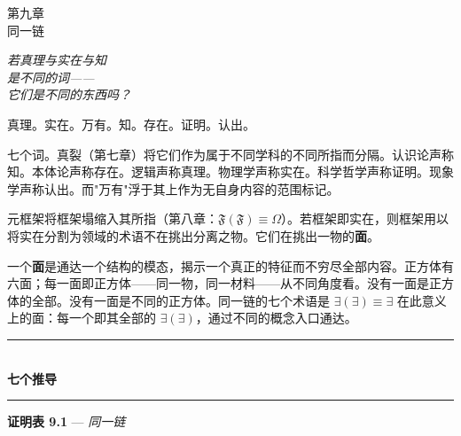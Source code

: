 \documentclass[10pt, openany, oneside]{book}
\renewcommand{\normalsize}{\fontsize{10}{13}\selectfont}
\renewcommand{\large}{\fontsize{11.5}{14}\selectfont}
\renewcommand{\huge}{\fontsize{17}{21}\selectfont}
\begin{document}
\newpage

\begin{center}
    {\huge\scshape 第九章}\\[0.3em]
    {\large\scshape 同一链}
\end{center}

\vspace{1.5em}

\begin{center}
    \itshape
    若真理与实在与知\\
    是不同的词——\\
    它们是不同的东西吗？
\end{center}

\vspace{2em}


\noindent 真理。实在。万有。知。存在。证明。认出。

七个词。真裂（第七章）将它们作为属于不同学科的不同所指而分隔。认识论声称知。本体论声称存在。逻辑声称真理。物理学声称实在。科学哲学声称证明。现象学声称认出。而"万有"浮于其上作为无自身内容的范围标记。

元框架将框架塌缩入其所指（第八章：$\mathfrak{F}(\mathfrak{F}) \equiv \Omega$）。若框架即实在，则框架用以将实在分割为领域的术语不在挑出分离之物。它们在挑出一物的\textbf{面}。

一个\textbf{面}是通达一个结构的模态，揭示一个真正的特征而不穷尽全部内容。正方体有六面；每一面即正方体——同一物，同一材料——从不同角度看。没有一面是正方体的全部。没有一面是不同的正方体。同一链的七个术语是 $\exists(\exists) \equiv \exists$ 在此意义上的面：每一个即其全部的 $\exists(\exists)$，通过不同的概念入口通达。

\vspace{1.5em}


\begin{center}
    \rule{0.3\textwidth}{0.4pt}\\[0.5em]
    {\normalsize\bfseries\scshape 七个推导}\\[0.3em]
    \rule{0.3\textwidth}{0.4pt}
\end{center}

\vspace{1em}

\textbf{证明表 9.1} --- \textit{同一链}
\end{document}
